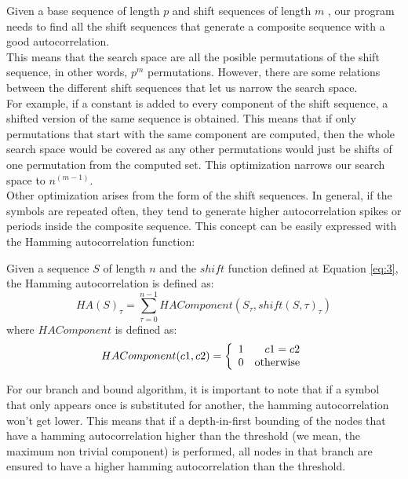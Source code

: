   Given a base sequence of length $p$ and  shift sequences of length $m$ ,
  our program needs to find all the shift sequences that generate a composite
  sequence with a good autocorrelation.\\

  This means that the search space are all the posible permutations of the
  shift sequence, in other words, $p^m$ permutations. However, there are some
  relations between the different shift sequences that let us narrow the
  search space.\\

  For example, if a constant is added to every component of the shift sequence,
  a shifted version of the same sequence is obtained. This means that if only
   permutations that start with the same component are computed,
  then the whole search space would be covered as any other permutations would just
  be shifts of one permutation from the computed set. This optimization narrows
  our search space to $n^{(m-1)}$.\\

  Other optimization arises from the form of the shift sequences. In general,
  if the symbols are repeated often, they tend to generate higher
  autocorrelation spikes or periods inside the composite sequence. This
  concept can be easily expressed with the Hamming autocorrelation function:\\

  \begin{definition}
    Given a sequence $S$ of length $n$ and the  $shift$ function  defined at
    Equation \eqref{eq:3}, the Hamming autocorrelation is defined as:
      \begin{equation} \label{hamming:eq:1}
        HA(S)_{\tau} = \sum_{\tau = 0}^{n-1} HAComponent(S_{\tau}, shift(S, \tau)_{\tau})
      \end{equation}
    where $HAComponent$ is defined as:
      \begin{equation}
        HAComponent(c1, c2) = \left\{\begin{array}{lr}
            1  &  c1 = c2\\
            0  & \textnormal{otherwise} \\
        \end{array}\right.
      \end{equation}
  \end{definition}

  For our branch and bound algorithm, it is important to note that if a symbol
  that only appears once is substituted for another, the hamming
  autocorrelation won't get lower. This means that if a depth-in-first
  bounding of the nodes that have a hamming autocorrelation higher than the
  threshold (we mean, the maximum non trivial component) is performed,
  all nodes in that branch are ensured to have a higher hamming autocorrelation
  than the threshold.\\

